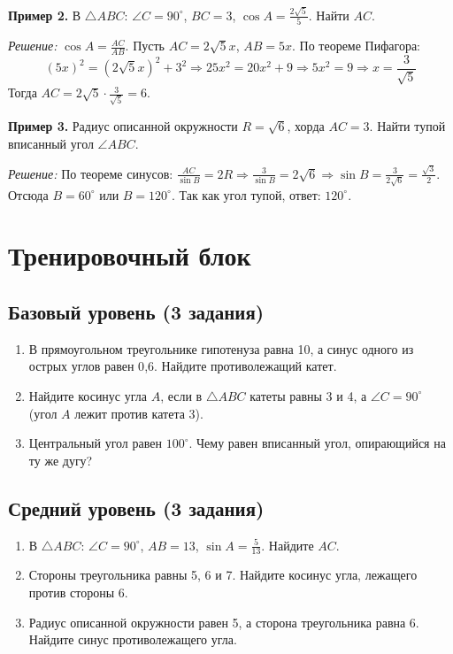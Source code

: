 \documentclass[a4paper,12pt]{article}
\begin{document}
\textbf{Пример 2.} В $\triangle ABC$: $\angle C = 90^\circ$, $BC = 3$, $\cos A = \frac{2\sqrt{5}}{5}$. Найти $AC$.

\textit{Решение:} $\cos A = \frac{AC}{AB}$. Пусть $AC = 2\sqrt{5}x$, $AB = 5x$. По теореме Пифагора:
$$(5x)^2 = (2\sqrt{5}x)^2 + 3^2 \Rightarrow 25x^2 = 20x^2 + 9 \Rightarrow 5x^2 = 9 \Rightarrow x = \frac{3}{\sqrt{5}}$$
Тогда $AC = 2\sqrt{5} \cdot \frac{3}{\sqrt{5}} = 6$.

\textbf{Пример 3.} Радиус описанной окружности $R = \sqrt{6}$, хорда $AC = 3$. Найти тупой вписанный угол $\angle ABC$.

\textit{Решение:} По теореме синусов: $\frac{AC}{\sin B} = 2R \Rightarrow \frac{3}{\sin B} = 2\sqrt{6} \Rightarrow \sin B = \frac{3}{2\sqrt{6}} = \frac{\sqrt{3}}{2}$.
Отсюда $B = 60^\circ$ или $B = 120^\circ$. Так как угол тупой, ответ: $120^\circ$.

\newpage

\section*{Тренировочный блок}

\subsection*{Базовый уровень (3 задания)}
\begin{enumerate}[label=\arabic*., leftmargin=*]
    \item В прямоугольном треугольнике гипотенуза равна 10, а синус одного из острых углов равен 0{,}6. Найдите противолежащий катет.
    
    \item Найдите косинус угла $A$, если в $\triangle ABC$ катеты равны 3 и 4, а $\angle C = 90^\circ$ (угол $A$ лежит против катета 3).
    
    \item Центральный угол равен $100^\circ$. Чему равен вписанный угол, опирающийся на ту же дугу?
\end{enumerate}

\subsection*{Средний уровень (3 задания)}
\begin{enumerate}[label=\arabic*., leftmargin=*, start=4]
    \item В $\triangle ABC$: $\angle C = 90^\circ$, $AB = 13$, $\sin A = \frac{5}{13}$. Найдите $AC$.
    
    \item Стороны треугольника равны 5, 6 и 7. Найдите косинус угла, лежащего против стороны 6.
    
    \item Радиус описанной окружности равен 5, а сторона треугольника равна 6. Найдите синус противолежащего угла.
\end{enumerate}
\end{document}
